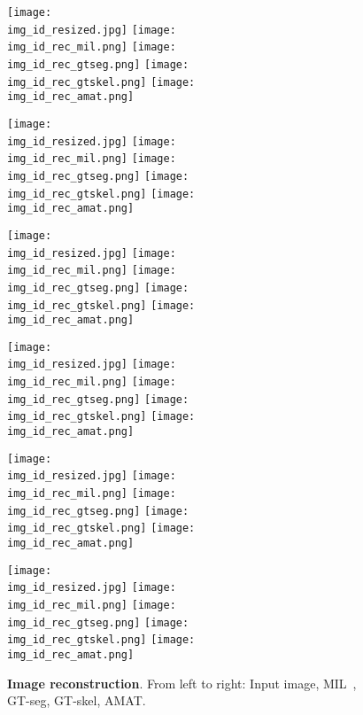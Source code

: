 \documentclass[10pt,twocolumn,letterpaper]{article}
\begin{document}
\begin{figure*}[t]
\centering
\def\imgw{0.195}

\def\img_id{3096}
\texttt{[image: \\img\_id\_resized.jpg]}
\texttt{[image: \\img\_id\_rec\_mil.png]}
\texttt{[image: \\img\_id\_rec\_gtseg.png]}
\texttt{[image: \\img\_id\_rec\_gtskel.png]}
\texttt{[image: \\img\_id\_rec\_amat.png]}

\def\img_id{300091}
\texttt{[image: \\img\_id\_resized.jpg]}
\texttt{[image: \\img\_id\_rec\_mil.png]}
\texttt{[image: \\img\_id\_rec\_gtseg.png]}
\texttt{[image: \\img\_id\_rec\_gtskel.png]}
\texttt{[image: \\img\_id\_rec\_amat.png]}

\def\img_id{119082}
\texttt{[image: \\img\_id\_resized.jpg]}
\texttt{[image: \\img\_id\_rec\_mil.png]}
\texttt{[image: \\img\_id\_rec\_gtseg.png]}
\texttt{[image: \\img\_id\_rec\_gtskel.png]}
\texttt{[image: \\img\_id\_rec\_amat.png]}

\def\img_id{295087}
\texttt{[image: \\img\_id\_resized.jpg]}
\texttt{[image: \\img\_id\_rec\_mil.png]}
\texttt{[image: \\img\_id\_rec\_gtseg.png]}
\texttt{[image: \\img\_id\_rec\_gtskel.png]}
\texttt{[image: \\img\_id\_rec\_amat.png]}

\def\img_id{54082}
\texttt{[image: \\img\_id\_resized.jpg]}
\texttt{[image: \\img\_id\_rec\_mil.png]}
\texttt{[image: \\img\_id\_rec\_gtseg.png]}
\texttt{[image: \\img\_id\_rec\_gtskel.png]}
\texttt{[image: \\img\_id\_rec\_amat.png]}

\def\img_id{101087}
\texttt{[image: \\img\_id\_resized.jpg]}
\texttt{[image: \\img\_id\_rec\_mil.png]}
\texttt{[image: \\img\_id\_rec\_gtseg.png]}
\texttt{[image: \\img\_id\_rec\_gtskel.png]}
\texttt{[image: \\img\_id\_rec\_amat.png]}

\caption{\textbf{Image reconstruction}. From left to right: Input image, MIL~\cite{tsogkas2012learning}, GT-seg, GT-skel, AMAT.}
\label{fig:experiments:reconstruction}
\end{figure*}





{\small


}
\end{document}
